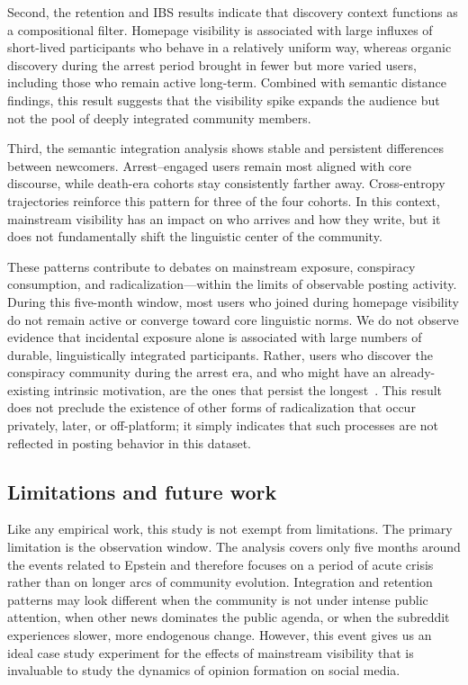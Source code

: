 \documentclass[letterpaper]{article} %
\begin{document}
Second, the retention and IBS results indicate that discovery context functions as a compositional filter. Homepage visibility is associated with large influxes of short-lived participants who behave in a relatively uniform way, whereas organic discovery during the arrest period brought in fewer but more varied users, including those who remain active long-term. Combined with semantic distance findings, this result suggests that the visibility spike expands the audience but not the pool of deeply integrated community members.

Third, the semantic integration analysis shows stable and persistent differences between newcomers.
Arrest--engaged users remain most aligned with core discourse, while death-era cohorts stay consistently farther away.
Cross-entropy trajectories reinforce this pattern for three of the four cohorts.
In this context, mainstream visibility has an impact on who arrives and how they write, but it does not fundamentally shift the linguistic center of the community.

These patterns contribute to debates on mainstream exposure, conspiracy consumption, and radicalization---within the limits of observable posting activity.
During this five-month window, most users who joined during homepage visibility do not remain active or converge toward core linguistic norms.
We do not observe evidence that incidental exposure alone is associated with large numbers of durable, linguistically integrated participants.
Rather, users who discover the conspiracy community during the arrest era, and who might have an already-existing intrinsic motivation, are the ones that persist the longest~\citep{corso2025early}.
This result does not preclude the existence of other forms of radicalization that occur privately, later, or off-platform; it simply indicates that such processes are not reflected in posting behavior in this dataset.


\subsection{Limitations and future work}
Like any empirical work, this study is not exempt from limitations.
The primary limitation is the observation window. 
The analysis covers only five months around the events related to Epstein and therefore focuses on a period of acute crisis rather than on longer arcs of community evolution. 
Integration and retention patterns may look different when the community is not under intense public attention, when other news dominates the public agenda, or when the subreddit experiences slower, more endogenous change.
However, this event gives us an ideal case study experiment for the effects of mainstream visibility that is invaluable to study the dynamics of opinion formation on social media.
\end{document}
